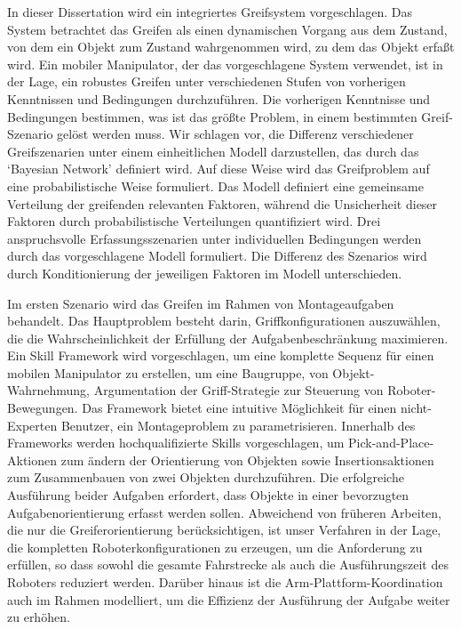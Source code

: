 In dieser Dissertation wird ein integriertes Greifsystem vorgeschlagen. Das System betrachtet das Greifen als einen dynamischen Vorgang aus dem Zustand, von dem ein Objekt zum Zustand wahrgenommen wird, zu dem das Objekt erfa{\ss}t wird. Ein mobiler Manipulator, der das vorgeschlagene System verwendet, ist in der Lage, ein robustes Greifen unter verschiedenen Stufen von vorherigen Kenntnissen und Bedingungen durchzuf\"uhren. Die vorherigen Kenntnisse und Bedingungen bestimmen, was ist das gr\"o{\ss}te Problem, in einem bestimmten Greif-Szenario gel\"ost werden muss. Wir schlagen vor, die Differenz verschiedener Greifszenarien unter einem einheitlichen Modell darzustellen, das durch das `Bayesian Network' definiert wird. Auf diese Weise wird das Greifproblem auf eine probabilistische Weise formuliert. Das Modell definiert eine gemeinsame Verteilung der greifenden relevanten Faktoren, w\"ahrend die Unsicherheit dieser Faktoren durch probabilistische Verteilungen quantifiziert wird. Drei anspruchsvolle Erfassungsszenarien unter individuellen Bedingungen werden durch das vorgeschlagene Modell formuliert. Die Differenz des Szenarios wird durch Konditionierung der jeweiligen Faktoren im Modell unterschieden.

Im ersten Szenario wird das Greifen im Rahmen von Montageaufgaben behandelt. Das Hauptproblem besteht darin, Griffkonfigurationen auszuw\"ahlen, die die Wahrscheinlichkeit der Erf\"ullung der Aufgabenbeschr\"ankung maximieren. Ein Skill Framework wird vorgeschlagen, um eine komplette Sequenz f\"ur einen mobilen Manipulator zu erstellen, um eine Baugruppe, von Objekt-Wahrnehmung, Argumentation der Griff-Strategie zur Steuerung von Roboter-Bewegungen. Das Framework bietet eine intuitive M\"oglichkeit f\"ur einen nicht-Experten Benutzer, ein Montageproblem zu parametrisieren. Innerhalb des Frameworks werden hochqualifizierte Skills vorgeschlagen, um Pick-and-Place-Aktionen zum \"andern der Orientierung von Objekten sowie Insertionsaktionen zum Zusammenbauen von zwei Objekten durchzuf\"uhren. Die erfolgreiche Ausf\"uhrung beider Aufgaben erfordert, dass Objekte in einer bevorzugten Aufgabenorientierung erfasst werden sollen. Abweichend von fr\"uheren Arbeiten, die nur die Greiferorientierung ber\"ucksichtigen, ist unser Verfahren in der Lage, die kompletten Roboterkonfigurationen zu erzeugen, um die Anforderung zu erf\"ullen, so dass sowohl die gesamte Fahrstrecke als auch die Ausf\"uhrungszeit des Roboters reduziert werden. Dar\"uber hinaus ist die Arm-Plattform-Koordination auch im Rahmen modelliert, um die Effizienz der Ausf\"uhrung der Aufgabe weiter zu erh\"ohen.

